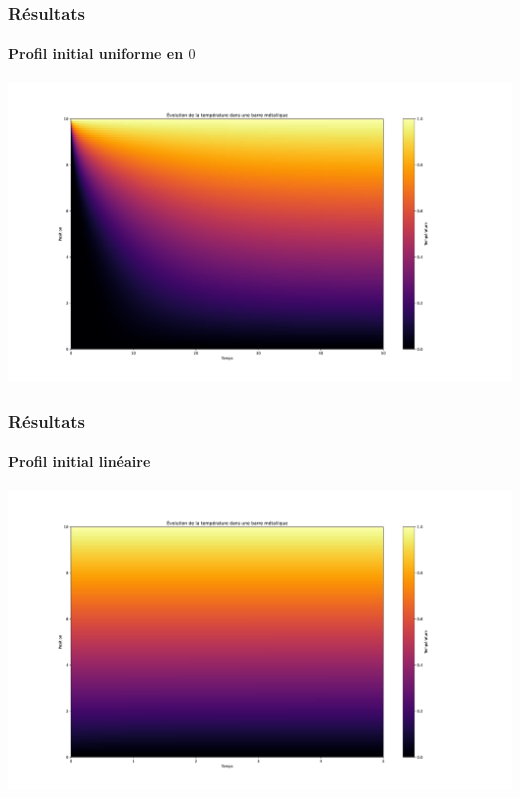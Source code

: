 \documentclass{beamer}
\begin{document}
    \begin{frame}
    \frametitle{Résultats}
    \framesubtitle{Profil initial uniforme en $0$}

    \begin{center}
    \includegraphics[width=1.2\linewidth]{figs/Figure_1.pdf}
    \end{center}


    \end{frame}


    \begin{frame}
    \frametitle{Résultats}
    \framesubtitle{Profil initial linéaire}

    \begin{center}
    \includegraphics[width=1.2\linewidth]{figs/Figure_4.pdf}
    \end{center}


    \end{frame}
\end{document}
